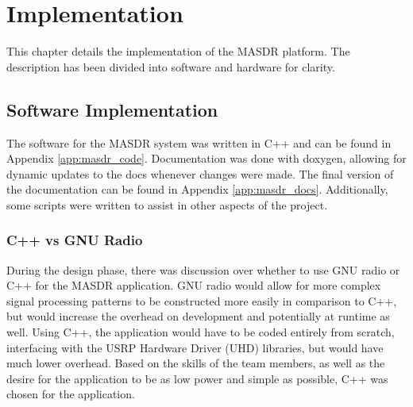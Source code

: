 \chapter{Implementation}

This chapter details the implementation of the MASDR platform. The description has been divided into software and hardware for clarity.

\section{Software Implementation}
The software for the MASDR system was written in C++ and can be found in Appendix \ref{app:masdr_code}. Documentation was done with doxygen, allowing for dynamic updates to the docs whenever changes were made. The final version of the documentation can be found in Appendix \ref{app:masdr_docs}. Additionally, some scripts were written to assist in other aspects of the project.
\subsection{C++ vs GNU Radio}
During the design phase, there was discussion over whether to use GNU radio or C++ for the MASDR application. GNU radio would allow for more complex signal processing patterns to be constructed more easily in comparison to C++, but would increase the overhead on development and potentially at runtime as well. Using C++, the application would have to be coded entirely from scratch, interfacing with the USRP Hardware Driver (UHD) libraries, but would have much lower overhead. Based on the skills of the team members, as well as the desire for the application to be as low power and simple as possible, C++ was chosen for the application.
